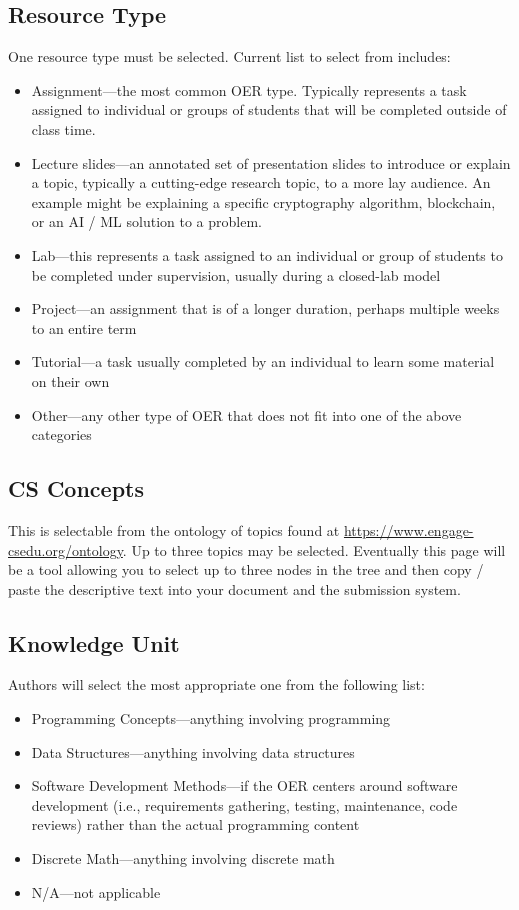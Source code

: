 \documentclass[acmengage]{acmart}
\begin{document}
\subsection{Resource Type}
One resource type must be selected. Current list to select from includes:

\begin{itemize}
    \item Assignment---the most common OER type. Typically represents a task assigned to individual or groups of students that will be completed outside of class time.
    \item Lecture slides---an annotated set of presentation slides to introduce or explain a topic, typically a cutting-edge research topic, to a more lay audience. An example might be explaining a specific cryptography algorithm, blockchain, or an AI / ML solution to a problem.
    \item Lab---this represents a task assigned to an individual or group of students to be completed under supervision, usually during a closed-lab model
    \item Project---an assignment that is of a longer duration, perhaps multiple weeks to an entire term
    \item Tutorial---a task usually completed by an individual to learn some material on their own
    \item Other---any other type of OER that does not fit into one of the above categories
\end{itemize}

\subsection{CS Concepts}
This is selectable from the ontology of topics found at \url{https://www.engage-csedu.org/ontology}. Up to three topics may be selected. Eventually this page will be a tool allowing you to select up to three nodes in the tree and then copy / paste the descriptive text into your document and the submission system.

\subsection{Knowledge Unit}
Authors will select the most appropriate one from the following list:

\begin{itemize}
    \item Programming Concepts---anything involving programming
    \item Data Structures---anything involving data structures
    \item Software Development Methods---if the OER centers around software development (i.e., requirements gathering, testing, maintenance, code reviews) rather than the actual programming content
    \item Discrete Math---anything involving discrete math
    \item N/A---not applicable
\end{itemize}
\end{document}
